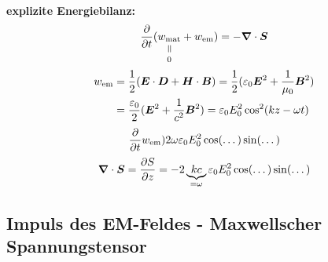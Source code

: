 \\
\textbf{explizite Energiebilanz:}
\begin{equation*}
\prt{}{t} (\equalto{w_{\tx{mat}}}{0} + w_{\tx{em}}) = - \vabla \cdot \vec{S}
\end{equation*}
\begin{align*}
w_{\textrm{em}} &= \frac{1}{2} (\bm{E} \cdot \bm{D} + \bm{H} \cdot \bm{B}) = \frac{1}{2} (\varepsilon_0 \bm{E}^2 + \frac{1}{\mu_0} \bm{B}^2) \\
&= \frac{\varepsilon_0}{2} (\bm{E}^2 + \frac{1}{c^2} \bm{B}^2) = \varepsilon_0 E_0^2 \cos^2(kz - \omega t)
\end{align*}
\begin{equation*}
\frac{\partial }{\partial t} w_{\textrm{em}} ) 2 \omega \varepsilon_0 E_0^2 \cos(\dots) \sin(\dots)
\end{equation*}
\begin{equation*}
\bm{\nabla} \cdot \bm{S} = \frac{\partial S}{\partial z} = - 2 \underbrace{kc}_{= \omega} \varepsilon_0 E_0^2 \cos(\dots) \sin(\dots)
\end{equation*}

\subsection{Impuls des EM-Feldes - Maxwellscher Spannungstensor}

